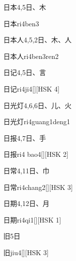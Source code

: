 \begin{entry}{日本}{4,5}{⽇、⽊}
  \begin{phonetics}{日本}{ri4ben3}
  \end{phonetics}
\end{entry}

\begin{entry}{日本人}{4,5,2}{⽇、⽊、⼈}
  \begin{phonetics}{日本人}{ri4ben3ren2}
  \end{phonetics}
\end{entry}

\begin{entry}{日记}{4,5}{⽇、⾔}
  \begin{phonetics}{日记}{ri4ji4}[][HSK 4]
  \end{phonetics}
\end{entry}

\begin{entry}{日光灯}{4,6,6}{⽇、⼉、⽕}
  \begin{phonetics}{日光灯}{ri4guang1deng1}
  \end{phonetics}
\end{entry}

\begin{entry}{日报}{4,7}{⽇、⼿}
  \begin{phonetics}{日报}{ri4 bao4}[][HSK 2]
  \end{phonetics}
\end{entry}

\begin{entry}{日常}{4,11}{⽇、⼱}
  \begin{phonetics}{日常}{ri4chang2}[][HSK 3]
  \end{phonetics}
\end{entry}

\begin{entry}{日期}{4,12}{⽇、⽉}
  \begin{phonetics}{日期}{ri4qi1}[][HSK 1]
  \end{phonetics}
\end{entry}

\begin{entry}{旧}{5}{⽇}
  \begin{phonetics}{旧}{jiu4}[][HSK 3]
  \end{phonetics}
\end{entry}

